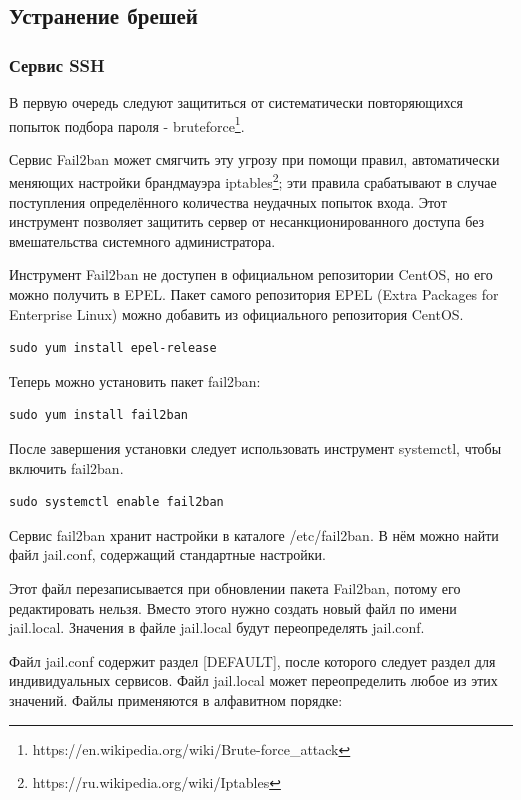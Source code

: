\subsection{Устранение брешей}

\subsubsection{Сервис SSH}

В первую очередь следуют защититься от систематически повторяющихся попыток подбора пароля - bruteforce\footnote{https://en.wikipedia.org/wiki/Brute-force\_attack}.

Сервис Fail2ban может смягчить эту угрозу при помощи правил, автоматически меняющих настройки брандмауэра iptables\footnote{https://ru.wikipedia.org/wiki/Iptables}; эти правила срабатывают в случае поступления определённого количества неудачных попыток входа. Этот инструмент позволяет защитить сервер от несанкционированного доступа без вмешательства системного администратора.

Инструмент Fail2ban не доступен в официальном репозитории CentOS, но его можно получить в EPEL. Пакет самого репозитория EPEL (Extra Packages for Enterprise Linux) можно добавить из официального репозитория CentOS.

\begin{lstlisting}
sudo yum install epel-release
\end{lstlisting}

Теперь можно установить пакет fail2ban:

\begin{lstlisting}
sudo yum install fail2ban
\end{lstlisting}

После завершения установки следует использовать инструмент systemctl, чтобы включить fail2ban.

\begin{lstlisting}
sudo systemctl enable fail2ban
\end{lstlisting}

Сервис fail2ban хранит настройки в каталоге /etc/fail2ban. В нём можно найти файл jail.conf, содержащий стандартные настройки.

Этот файл перезаписывается при обновлении пакета Fail2ban, потому его редактировать нельзя. Вместо этого нужно создать новый файл по имени jail.local. Значения в файле jail.local будут переопределять jail.conf.

Файл jail.conf содержит раздел [DEFAULT], после которого следует раздел для индивидуальных сервисов. Файл jail.local может переопределить любое из этих значений. Файлы применяются в алфавитном порядке:

